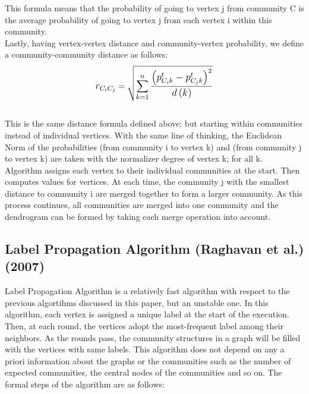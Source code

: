 \documentclass[10pt]{article}
\begin{document}
This formula means that the probability of going to vertex j from community C is the average probability of going to vertex j from each vertex i within this community. \\

Lastly, having vertex-vertex distance and community-vertex probability, we define a community-community distance as follows: \\

\[ \mathlarger{ r_{C_{i}C_{j}} } = \sqrt{ \mathlarger { \sum_{k=1}^{n} \frac{ \left( p_{C_{i}k}^{t} - p_{C_{j}k}^{t} \right)^{2} }{d\left( k \right) } } } \] \\

This is the same distance formula defined above; but starting within communities instead of individual vertices. With the same line of thinking, the Euclidean Norm of the probabilities (from community i to vertex k) and (from community j to vertex k) are taken with the normalizer degree of vertex k; for all k. \\

Algorithm assigns each vertex to their individual communities at the start. Then computes values for vertices. At each time, the community j with the smallest distance to community i are
merged together to form a larger community. As this process continues, all communities are merged into one community and the dendrogram can be formed by taking each merge operation into account. \\

\subsection{Label Propagation Algorithm (Raghavan et al.) (2007)}

Label Propagation Algorithm is a relatively fast algorithm with respect to the previous algortihms discussed in this paper, but an unstable one. In this algorithm, each vertex is assigned a unique label at the start of the execution. Then, at each round, the vertices adopt the most-frequent label among their neighbors. As the rounds pass, the community structures in a graph will be filled with the vertices with same labels\cite{raghavan}. This algorithm does not depend on any a priori information about the graphs or the communities such as the number of expected communities, the central nodes of the communities and so on. The formal steps of the algorithm are as follows: \\
\end{document}
